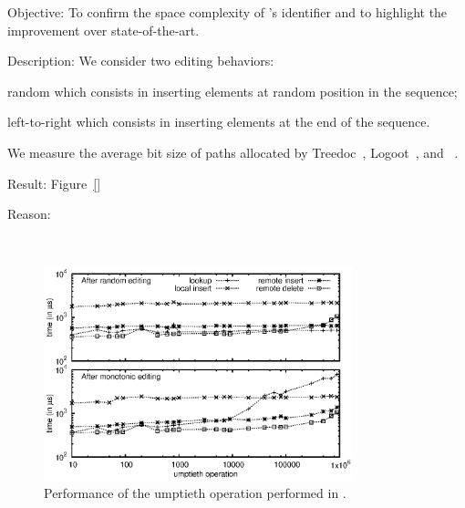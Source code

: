 \begin{asparadesc}
\item [Objective:] To confirm the space complexity of \LSEQ's identifier and to
  highlight the improvement over state-of-the-art.
\item [Description:] We consider two editing behaviors:
  \begin{inparaenum}[(i)]
  \item random which consists in inserting elements at random position in the sequence;
  \item left-to-right which consists in inserting elements at the end of the
    sequence.
  \end{inparaenum} We measure the average bit size of paths allocated by
  Treedoc~\cite{preguica2009commutative}, Logoot~\cite{weiss2009logoot}, and
  \LSEQ~\cite{nedelec2013lseq}.
\item [Result:] Figure~\ref{}
\item [Reason:]
\end{asparadesc}

\ \\ 

\begin{figure}
  \centering
  \includegraphics[width=0.8\textwidth]{./img/bench.eps}
  \caption{\label{fig:bench} Performance of the umptieth operation performed in
    \LSEQ.}
\end{figure}

